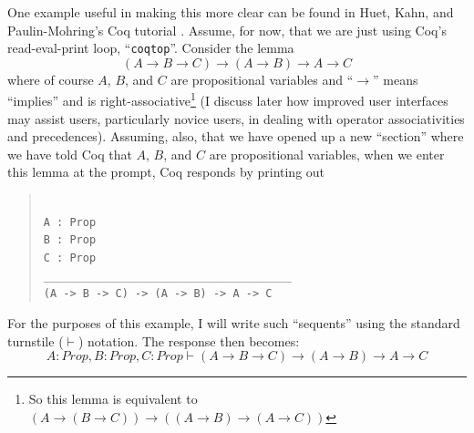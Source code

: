 \documentclass[11pt]{amsart}
\newcommand{\ra}{\ensuremath{\rightarrow}}
\begin{document}
One example useful in making this more clear can be found in Huet, Kahn, and Paulin-Mohring's Coq tutorial \cite{huet1997coq}. Assume, for now, that we are just using Coq's read-eval-print loop, ``\texttt{coqtop}''.  Consider the lemma
\begin{equation}\label{exampleLemma}(A \ra B \ra C) \ra (A \ra B) \ra A \ra C\end{equation}
where of course $A$, $B$, and $C$ are propositional variables and ``\ra'' means ``implies'' and is right-associative\footnote{So this lemma is equivalent to $(A \ra (B \ra C)) \ra ((A \ra B) \ra (A \ra C))$} (I discuss later how improved user interfaces may assist users, particularly novice users, in dealing with operator associativities and precedences).  Assuming, also, that we have opened up a new ``section'' where we have told Coq that $A$, $B$, and $C$ are propositional variables, when we enter this lemma at the prompt, Coq responds by printing out
\begin{quote}
\texttt{ \\
A : Prop \\
B : Prop \\
C : Prop \\
\_\_\_\_\_\_\_\_\_\_\_\_\_\_\_\_\_\_\_\_\_\_\_\_\_\_\_\_\_\_\_\_\_\_\_\_\_\_ \\%
(A -> B -> C) -> (A -> B) -> A -> C \\}

\end{quote}


For the purposes of this example, I will write such ``sequents'' using the standard turnstile ($\vdash$) notation.  The response then becomes: 
\begin{equation}\label{initialGoal}A : Prop, B : Prop, C : Prop \vdash (A \ra B \ra C) \ra (A \ra B) \ra A \ra C\end{equation}
\end{document}
